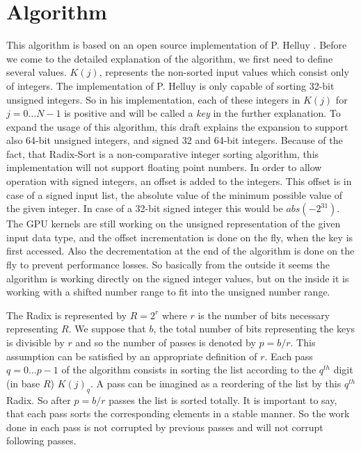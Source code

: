\documentclass{llncs}
\title{\doctype}
\author{Hennadiy Yatskov\\ Nico Mürdter}
\institute{
Karlsruhe Institute of Technology, Karlsruhe, Germany\\
\email{hennadiy.yatskov@student.kit.edu\\ nico.muerdter@student.kit.edu}}
\begin{document}

\def\iterationcnt{5}

\maketitle

\begin{abstract}
TODO
\end{abstract}

\pagestyle{plain}

\section{Algorithm}
\label{Algorithm}
This algorithm is based on an open source implementation of P. Helluy \cite{ocl-radix-helluy}. Before we come to the detailed explanation of the algorithm, we first need to define several values. $K(j)$, represents the non-sorted input values which consist only of integers. The implementation of P. Helluy is only capable of sorting 32-bit unsigned integers. So in his implementation, each of these integers in $K(j)$ for $j=0 \dots N-1$ is positive and will be called a \textit{key} in the further explanation. To expand the usage of this algorithm, this draft explains the expansion to support also 64-bit unsigned integers, and signed 32 and 64-bit integers. Because of the fact, that Radix-Sort is a non-comparative integer sorting algorithm, this implementation will not support floating point numbers. In order to allow operation with signed integers, an offset is added to the integers. This offset is in case of a signed input list, the absolute value of the minimum possible value of the given integer. In case of a 32-bit signed integer this would be $abs(-2^{31})$. The GPU kernels are still working on the unsigned representation of the given input data type, and the offset incrementation is done on the fly, when the key is first accessed. Also the decrementation at the end of the algorithm is done on the fly to prevent performance losses. So basically from the outside it seems the algorithm is working directly on the signed integer values, but on the inside it is working with a shifted number range to fit into the unsigned number range.

The Radix is represented by $R = 2^r$ where $r$ is the number of bits necessary representing $R$. We suppose that $b$, the total number of bits representing the keys is divisible by $r$ and so the number of passes is denoted by $p = b/r$. This assumption can be satisfied by an appropriate definition of $r$. Each pass $q=0 \dots p-1$ of the algorithm consists in sorting the list according to the $q^{th}$ digit (in base $R$) $K(j)_q$. A pass can be imagined as a reordering of the list by this $q^{th}$ Radix. So after $p = b/r$ passes the list is sorted totally. It is important to say, that each pass sorts the corresponding elements in a stable manner. So the work done in each pass is not corrupted by previous passes and will not corrupt following passes.
\end{document}
